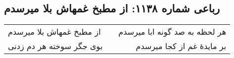 \begin{center}
\section*{رباعی شماره ۱۱۳۸: از مطبخ غمهاش بلا میرسدم}
\label{sec:1138}
\begin{longtable}{l p{0.5cm} r}
از مطبخ غمهاش بلا میرسدم
&&
هر لحظه به صد گونه ابا میرسدم
\\
بوی جگر سوخته هر دم زدنی
&&
بر مایدهٔ غم از کجا میرسدم
\\
\end{longtable}
\end{center}
